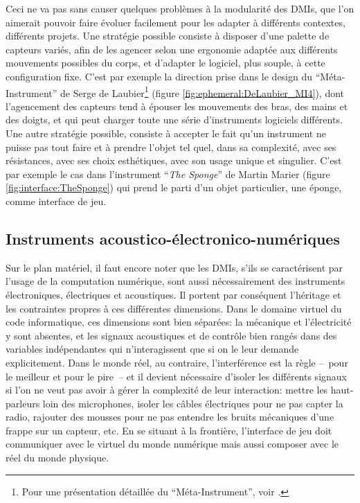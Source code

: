\indent Ceci ne va pas sans causer quelques problèmes à la modularité des \glspl{DMI}, que l'on aimerait pouvoir faire évoluer facilement pour les adapter à différents contextes, différents projets. Une stratégie possible consiste à disposer d'une palette de capteurs variés, afin de les agencer selon une ergonomie adaptée aux différents mouvements possibles du corps, et d'adapter le logiciel, plus souple, à cette configuration fixe. C'est par exemple la direction prise dans le design du ``Méta-Instrument'' de Serge de Laubier\footnote{Pour une présentation détaillée du ``Méta-Instrument'', voir \cite{couprie_meta-instrument:_2018}.} (figure \ref{fig:ephemeral:DeLaubier_MI4}), dont l'agencement des capteurs tend à épouser les mouvements des bras, des mains et des doigts, et qui peut charger toute une série d'instruments logiciels différents. Une autre stratégie possible, consiste à accepter le fait qu'un instrument ne puisse pas tout faire et à prendre l'objet tel quel, dans sa complexité, avec ses résistances, avec ses choix esthétiques, avec son usage unique et singulier. C'est par exemple le cas dans l'instrument ``\textit{The Sponge}'' de Martin Marier (figure \ref{fig:interface:TheSponge}) qui prend le parti d'un objet particulier, une éponge, comme interface de jeu.

\subsection{Instruments acoustico-électronico-numériques}

\noindent Sur le plan matériel, il faut encore noter que les \glspl{DMI}, s'ils se caractérisent par l'usage de la computation numérique, sont aussi nécessairement des instruments électroniques, électriques et acoustiques. Il portent par conséquent l'héritage et les contraintes propres à ces différentes dimensions. Dans le domaine virtuel du code informatique, ces dimensions sont bien séparées: la mécanique et l'électricité y sont absentes, et les signaux acoustiques et de contrôle bien rangés dans des variables indépendantes qui n'interagissent que si on le leur demande explicitement. Dans le monde réel, au contraire, l'interférence est la règle --~pour le meilleur et pour le pire~-- et il devient nécessaire d'isoler les différents signaux si l'on ne veut pas avoir à gérer la complexité de leur interaction: mettre les haut-parleurs loin des microphones, isoler les câbles électriques pour ne pas capter la radio, rajouter des mousses pour ne pas entendre les bruits mécaniques d'une frappe sur un capteur, etc. En se situant à la frontière, l'interface de jeu doit communiquer avec le virtuel du monde numérique mais aussi composer avec le réel du monde physique.

